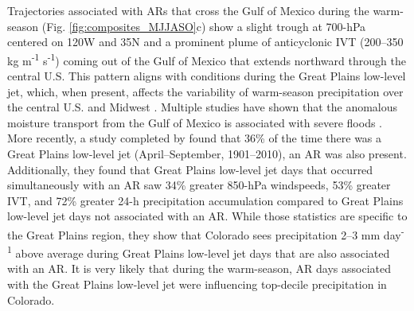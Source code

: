 \documentclass[draft]{agujournal2019}
\begin{document}
Trajectories associated with ARs that cross the Gulf of Mexico during the warm-season (Fig. \ref{fig:composites_MJJASO}c) show a slight trough at 700-hPa centered on 120\textdegree W and 35\textdegree N and a prominent plume of anticyclonic IVT (200--350 kg m\textsuperscript{-1} s\textsuperscript{-1}) coming out of the Gulf of Mexico that extends northward through the central U.S. This pattern aligns with conditions during the Great Plains low-level jet, which, when present, affects the variability of warm-season precipitation over the central U.S. and Midwest \cite{Pu2016DynamicalPrecipitation, Helfand1995ClimatologyStates, Weaver2008VariabilityImpacts, Schubert1998SubseasonalStates}. Multiple studies have shown that the anomalous moisture transport from the Gulf of Mexico is associated with severe floods \cite{Mo1997AtmosphericStates, Weaver2009PentadBalance}. More recently, a study completed by  found that 36\% of the time there was a Great Plains low-level jet (April--September, 1901--2010), an AR was also present. Additionally, they found that Great Plains low-level jet days that occurred simultaneously with an AR saw 34\% greater 850-hPa windspeeds, 53\% greater IVT, and
72\% greater 24-h precipitation accumulation compared to Great Plains low-level jet days not associated with an AR. While those statistics are specific to the Great Plains region, they show that Colorado sees precipitation 2--3 mm day\textsuperscript{-1} above average during Great Plains low-level jet days that are also associated with an AR. It is very likely that during the warm-season, AR days associated with the Great Plains low-level jet were influencing top-decile precipitation in Colorado. 
\end{document}

